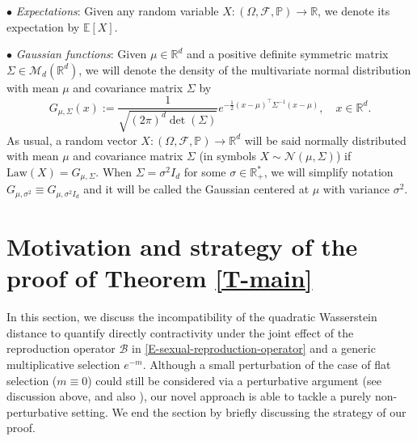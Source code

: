\documentclass[reqno]{amsart}
\numberwithin{equation}{section}
\begin{document}
{\noindent $\bullet$ {\it Expectations}: Given any random variable $X:(\Omega,\mathcal{F},\mathbb{P})\longrightarrow \mathbb{R}$, we denote its expectation by $\mathbb{E}[X]$. 

\noindent $\bullet$ {\it Gaussian functions}: Given $\mu\in \mathbb{R}^d$ and a positive definite symmetric matrix $\Sigma\in \mathcal{M}_d(\mathbb{R}^d)$, we will denote the density of the multivariate normal distribution with mean $\mu$ and covariance matrix $\Sigma$ by
$$G_{\mu,\Sigma}(x):=\frac{1}{\sqrt{(2\pi)^d \det(\Sigma)}}e^{-\frac{1}{2}(x-\mu)^\top \Sigma^{-1}(x-\mu)},\quad x\in \mathbb{R}^d.$$
As usual, a random vector $X:(\Omega,\mathcal{F},\mathbb{P})\longrightarrow \mathbb{R}^d$ will be said normally distributed with mean $\mu$ and covariance matrix $\Sigma$ (in symbols $X\sim \mathcal{N}(\mu,\Sigma)$) if $\text{Law}(X)=G_{\mu,\Sigma}$. When $\Sigma=\sigma^2 I_d$ for some $\sigma\in \mathbb{R}_+^*$, we will simplify notation $G_{\mu,\sigma^2}\equiv G_{\mu,\sigma^2 I_d}$ and it will be called the Gaussian centered at $\mu$ with variance $\sigma^2$.

\section{Motivation and strategy of the proof of Theorem \ref{T-main}}\label{S-observations}

In this section, we discuss the incompatibility of the quadratic Wasserstein distance to quantify directly contractivity under the joint effect of the reproduction operator $\mathcal{B}$ in \eqref{E-sexual-reproduction-operator} and a generic multiplicative selection $e^{-m}$. Although a small perturbation of the case of flat selection ($m\equiv 0$) could still be considered via a perturbative argument (see discussion above, \cite{R-21-arxiv} and also \cite{R-17-arxiv}), our novel approach is able to tackle a purely non-perturbative setting. We end the section by briefly discussing the strategy of our proof.

}
\end{document}
